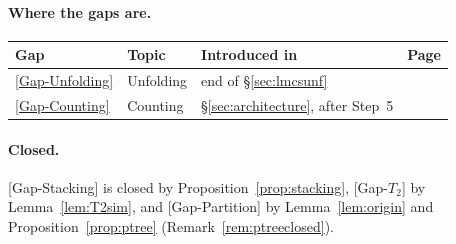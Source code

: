 \documentclass[11pt]{article}
\theoremstyle{plain}
\theoremstyle{definition}
\theoremstyle{remark}
\newcommand{\GapUnfolding}{\hyperref[gap:unfold]{[Gap-Unfolding]}}
\newcommand{\GapCounting}{\hyperref[gap:count]{[Gap-Counting]}}
\begin{document}
\paragraph{Where the gaps are.}
\begin{center}
\small
\begin{tabular}{llll}
Gap & Topic & Introduced in & Page\\\hline
\GapUnfolding & Unfolding & end of \S\ref{sec:lmcsunf} & \pageref{gap:unfold}\\
\GapCounting & Counting & \S\ref{sec:architecture}, after Step~5 & \pageref{gap:count}
\end{tabular}
\end{center}

\paragraph{Closed.}
[Gap-Stacking] is closed by Proposition~\ref{prop:stacking}, [Gap-$T_2$]
by Lemma~\ref{lem:T2sim}, and [Gap-Partition] by Lemma~\ref{lem:origin}
and Proposition~\ref{prop:ptree} (Remark~\ref{rem:ptreeclosed}).
\end{document}
